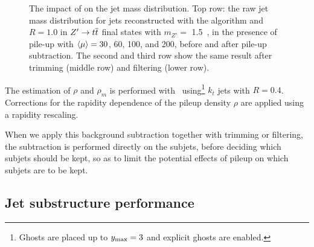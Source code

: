 \begin{figure} [p!]
\begin{center}
\end{center}
\caption[]{The impact of \pu{} on the jet mass distribution. Top row: the raw jet mass distribution for jets reconstructed with the \antikt{} algorithm and $R = 1.0$ in $Z' \to t\overline{t}$ final states with $m_{Z'} =$ 1.5~\tev{}, in the presence of pile-up with $\langle\mu\rangle = 30$, 60, 100, and 200, before and after pile-up subtraction. The second and third row show the same result after trimming (middle row) and filtering (lower row).}
\label{fig:mass_spectra}
\end{figure}

The estimation of $\rho$ and $\rho_m$ is performed with \FJ\ 
using\footnote{Ghosts
  are placed up to $y_{\rm max}=3$ and explicit ghosts are enabled.}
$k_t$ jets with $R=0.4$. Corrections for the rapidity dependence of
the pileup density $\rho$ are applied using a rapidity rescaling.

When we apply this background subtraction together with trimming or
filtering, the subtraction is performed directly on the subjets,
before deciding which subjets should be kept, so as to limit the
potential effects of pileup on which subjets are to be kept.

\subsection{Jet substructure performance}
\label{sec:results}

%





